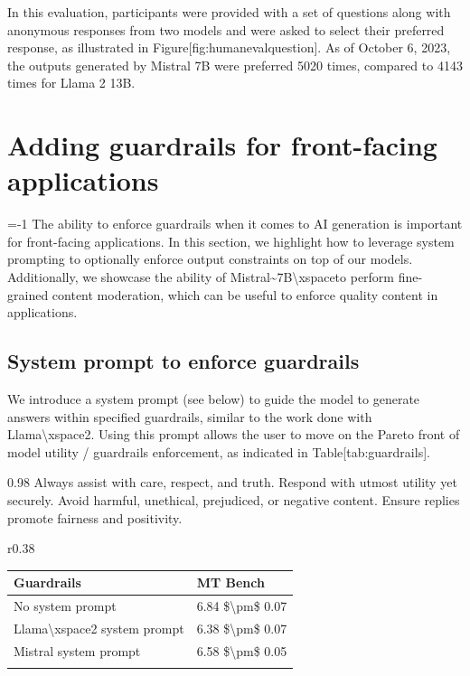 \documentclass[11pt,a4paper]{article}
\begin{document}
In this evaluation, participants were provided with a set of questions along with anonymous responses from two models and were asked to select their preferred response, as illustrated in Figure[fig:humanevalquestion]. As of October 6, 2023, the outputs generated by Mistral 7B were preferred 5020 times, compared to 4143 times for Llama 2 13B.

\section{Adding guardrails for front-facing applications}

=-1 The ability to enforce guardrails when it comes to AI generation is important for front-facing applications. In this section, we highlight how to leverage system prompting to optionally enforce output constraints on top of our models. Additionally, we showcase the ability of Mistral\textasciitilde{}7B\textbackslash{}xspaceto perform fine-grained content moderation, which can be useful to enforce quality content in applications.

\subsection{System prompt to enforce guardrails}

We introduce a system prompt (see below) to guide the model to generate answers within specified guardrails, similar to the work done with Llama\textbackslash{}xspace2. Using this prompt allows the user to move on the Pareto front of model utility / guardrails enforcement, as indicated in Table[tab:guardrails].

0.98 Always assist with care, respect, and truth. Respond with utmost utility yet securely. Avoid harmful, unethical, prejudiced, or negative content. Ensure replies promote fairness and positivity.

r0.38

\begin{table}[h]
\begin{tabular}{|l|l|}
\hline
Guardrails & MT Bench \\ \hline
No system prompt & 6.84  \$\textbackslash{}pm\$  0.07 \\ \hline
Llama\textbackslash{}xspace2 system prompt & 6.38  \$\textbackslash{}pm\$  0.07 \\ \hline
Mistral system prompt & 6.58  \$\textbackslash{}pm\$  0.05 \\ \hline
 &  \\ \hline
\end{tabular}
\end{table}
\end{document}
